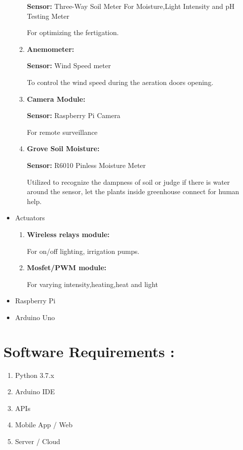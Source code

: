 \documentclass[12pt]{extarticle}
\begin{document}
\begin{itemize}
\begin{enumerate}
        \textbf{Sensor:} Three-Way Soil Meter For Moisture,Light Intensity and pH Testing Meter

For optimizing the fertigation.

        \item \textbf{Anemometer:}
        
        \textbf{Sensor:} Wind Speed meter

To control the wind speed during the aeration doors opening.

        \item \textbf{Camera Module:}
        
        \textbf{Sensor:} Raspberry Pi Camera

For remote surveillance

        \item \textbf{Grove Soil Moisture:}
        
        \textbf{Sensor:} R6010 Pinless Moisture Meter

Utilized to recognize the dampness of soil or judge if there is water around the sensor, let the plants inside greenhouse connect for human help.

    \end{enumerate} 
    
    \item Actuators \begin{enumerate}
        \item \textbf{Wireless relays module:}
        
For on/off lighting, irrigation pumps.

        \item \textbf{Mosfet/PWM module:}
        
For varying intensity,heating,heat and light

    \end{enumerate}

    \item Raspberry Pi

    \item Arduino Uno
\end{itemize}

\section{Software Requirements : }
\begin{enumerate}
    \item Python 3.7.x
    \item Arduino IDE
    \item APIs
    \item Mobile App / Web
    \item Server / Cloud
\end{enumerate}
\end{document}
